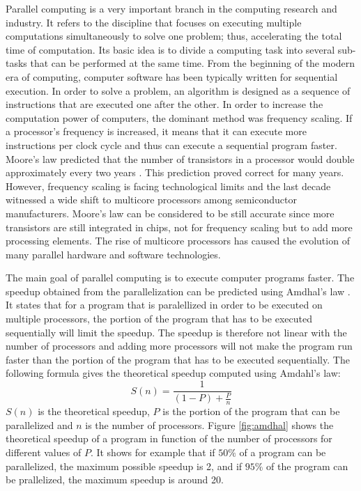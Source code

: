 Parallel computing is a very important branch in the computing research and industry. It refers to the discipline that focuses on executing multiple computations simultaneously to solve one problem; thus, accelerating the total time of computation. Its basic idea is to divide a computing task into several sub-tasks that can be performed at the same time. From the beginning of the modern era of computing, computer software has been typically written for sequential execution. In order to solve a problem, an algorithm is designed as a sequence of instructions that are executed one after the other. In order to increase the computation power of computers, the dominant method was frequency scaling. If a processor's frequency is increased, it means that it can execute more instructions per clock cycle and thus can execute a sequential program faster. Moore's law predicted that the number of transistors in a processor would double approximately every two years \cite{moore:1965}. This prediction proved correct for many years. However, frequency scaling is facing technological limits and the last decade witnessed a wide shift to multicore processors among semiconductor manufacturers. Moore's law can be considered to be still accurate since more transistors are still integrated in chips, not for frequency scaling but to add more processing elements. The rise of multicore processors has caused the evolution of many parallel hardware and software technologies.

The main goal of parallel computing is to execute computer programs faster. The speedup obtained from the parallelization can be predicted using Amdhal's law \cite{amdahl:1967}. It states that for a program that is paralellized in order to be executed on multiple processors, the portion of the program that has to be executed sequentially will limit the speedup. The speedup is therefore not linear with the number of processors and adding more processors will not make the program run faster than the portion of the program that has to be executed sequentially. The following formula gives the theoretical speedup computed using Amdahl's law:
\begin{equation}
S(n) = \frac{1}{(1-P) + \frac{P}{n}}
\end{equation}
$S(n)$ is the theoretical speedup, $P$ is the portion of the program that can be parallelized and $n$ is the number of processors. Figure \ref{fig:amdhal} shows the theoretical speedup of a program in function of the number of processors for different values of $P$. It shows for example that if $50\%$ of a program can be parallelized, the maximum possible speedup is 2, and if $95\%$ of the program can be prallelized, the maximum speedup is around 20.

